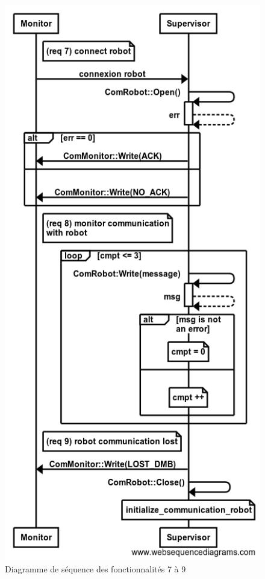 \begin{figure}[htbp]
\begin{center}
\includegraphics[scale=0.48]{./seq_req/req7-9}
\caption{Diagramme de séquence des fonctionnalités 7 à 9}
\label{fig:diag7_9}
\end{center}
\end{figure}
\FloatBarrier

